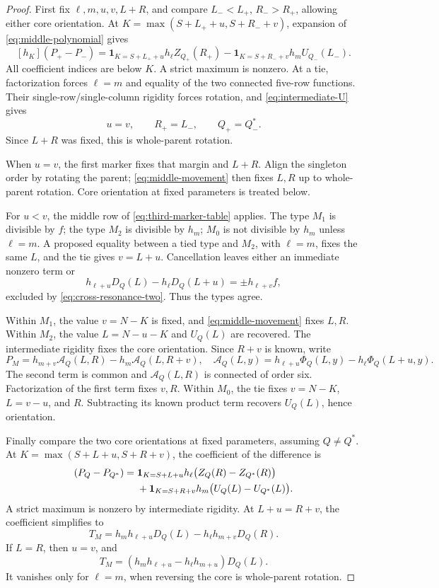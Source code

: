 \documentclass[11pt,a4paper]{amsart}
\numberwithin{equation}{section}
\theoremstyle{plain}
\theoremstyle{definition}
\begin{document}
\begin{proof}
First fix \(\ell,m,u,v,L+R\), and compare \(L_-<L_+\), \(R_->R_+\), allowing either core orientation.  At
\(K=\max(S+L_++u,S+R_-+v)\), expansion of \eqref{eq:middle-polynomial} gives
\begin{equation}\label{eq:middle-movement}
 [h_K](P_+-P_-)=
 \mathbf1_{K=S+L_++u}h_\ell Z_{Q_+}(R_+)
 -\mathbf1_{K=S+R_-+v}h_mU_{Q_-}(L_-).
\end{equation}
All coefficient indices are below \(K\).  A strict maximum is nonzero.  At a tie, factorization forces \(\ell=m\) and equality of the two connected five-row functions.  Their single-row/single-column rigidity forces rotation, and \eqref{eq:intermediate-U} gives
\[
 u=v,\qquad R_+=L_-,\qquad Q_+=Q_-^*.
\]
Since \(L+R\) was fixed, this is whole-parent rotation.

When \(u=v\), the first marker fixes that margin and \(L+R\).  Align the singleton order by rotating the parent; \eqref{eq:middle-movement} then fixes \(L,R\) up to whole-parent rotation.  Core orientation at fixed parameters is treated below.

For \(u<v\), the middle row of \eqref{eq:third-marker-table} applies.  The type \(M_1\) is divisible by \(f\); the type \(M_2\) is divisible by \(h_m\); \(M_0\) is not divisible by \(h_m\) unless \(\ell=m\).  A proposed equality between a tied type and \(M_2\), with \(\ell=m\), fixes the same \(L\), and the tie gives \(v=L+u\).  Cancellation leaves either an immediate nonzero term or
\[
 h_{\ell+u} D_Q(L)-h_\ell D_Q(L+u)
       =\pm h_{\ell+v}f,
\]
excluded by \eqref{eq:cross-resonance-two}.  Thus the types agree.

Within \(M_1\), the value \(v=N-K\) is fixed, and \eqref{eq:middle-movement} fixes \(L,R\).  Within \(M_2\), the value \(L=N-u-K\) and \(U_Q(L)\) are recovered.  The intermediate rigidity fixes the core orientation.  Since \(R+v\) is known, write
\[
 P_M=h_{m+v}\mathcal A_Q(L,R)-h_m\mathcal A_Q(L,R+v),
 \quad
 \mathcal A_Q(L,y)=h_{\ell+u}\Phi_Q(L,y)-h_\ell\Phi_Q(L+u,y).
\]
The second term is common and \(\mathcal A_Q(L,R)\) is connected of order six.  Factorization of the first term fixes \(v,R\).  Within \(M_0\), the tie fixes \(v=N-K\), \(L=v-u\), and \(R\).  Subtracting its known product term recovers \(U_Q(L)\), hence orientation.

Finally compare the two core orientations at fixed parameters, assuming \(Q\ne Q^*\).  At \(K=\max(S+L+u,S+R+v)\), the coefficient of the difference is
\begin{align}
 [h_K](P_Q-P_{Q^*})={}&
 \mathbf1_{K=S+L+u}h_\ell\bigl(Z_Q(R)-Z_{Q^*}(R)\bigr)\notag\\
 &+\mathbf1_{K=S+R+v}h_m\bigl(U_Q(L)-U_{Q^*}(L)\bigr).
 \label{eq:middle-orientation}
\end{align}
A strict maximum is nonzero by intermediate rigidity.  At \(L+u=R+v\), the coefficient simplifies to
\begin{equation}\label{eq:middle-final-tie}
 T_M=h_mh_{\ell+u} D_Q(L)-h_\ell h_{m+v} D_Q(R).
\end{equation}
If \(L=R\), then \(u=v\), and
\[
 T_M=(h_mh_{\ell+u}-h_\ell h_{m+u}) D_Q(L).
\]
It vanishes only for \(\ell=m\), when reversing the core is whole-parent rotation.


\end{proof}
\end{document}

